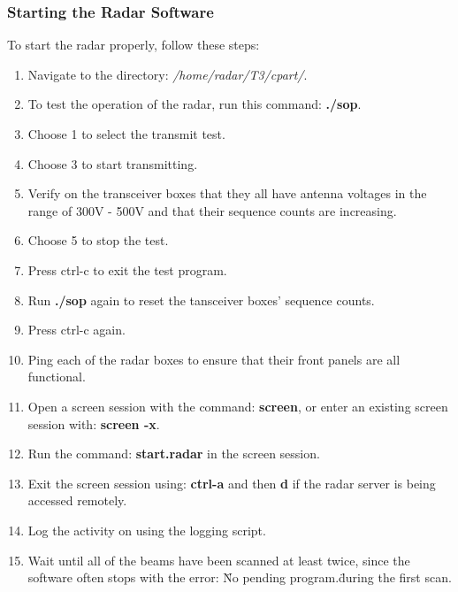 \subsubsection{Starting the Radar Software}
To start the radar properly, follow these steps:
\begin{enumerate}
	\item Navigate to the directory: \textit{/home/radar/T3/cpart/}.
	\item To test the operation of the radar, run this command: \textbf{./sop}.
	\item Choose 1 to select the transmit test.
	\item Choose 3 to start transmitting.
	\item Verify on the transceiver boxes that they all have antenna voltages in the range of 300V - 500V and that their sequence counts are increasing.
	\item Choose 5 to stop the test.
	\item Press ctrl-c to exit the test program.
	\item Run \textbf{./sop} again to reset the tansceiver boxes' sequence counts.
	\item Press ctrl-c again.
	\item Ping each of the radar boxes to ensure that their front panels are all functional.
	\item Open a screen session with the command: \textbf{screen}, or enter an existing screen session with: \textbf{screen -x}.
	\item Run the command: \textbf{start.radar} in the screen session.
	\item Exit the screen session using: \textbf{ctrl-a} and then \textbf{d} if the radar server is being accessed remotely.
	\item Log the activity on using the logging script.
	\item Wait until all of the beams have been scanned at least twice, since the software often stops with the error: \"No pending program.\" during the first scan.
\end{enumerate}

